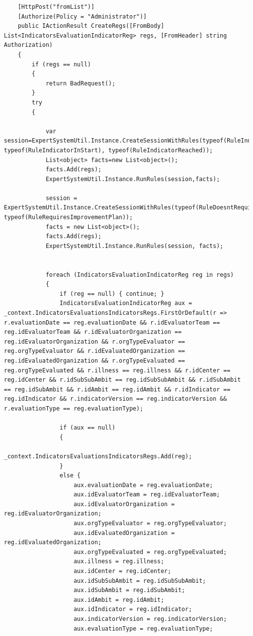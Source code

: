 \begin{lstlisting}
    [HttpPost("fromList")]
    [Authorize(Policy = "Administrator")]
    public IActionResult CreateRegs([FromBody] List<IndicatorsEvaluationIndicatorReg> regs, [FromHeader] string Authorization)
    {
        if (regs == null)
        {
            return BadRequest();
        }
        try
        {

            var session=ExpertSystemUtil.Instance.CreateSessionWithRules(typeof(RuleIndicatorInProcess), typeof(RuleIndicatorInStart), typeof(RuleIndicatorReached));
            List<object> facts=new List<object>();
            facts.Add(regs);
            ExpertSystemUtil.Instance.RunRules(session,facts);

            session = ExpertSystemUtil.Instance.CreateSessionWithRules(typeof(RuleDoesntRequireImprovementPlan), typeof(RuleRequiresImprovementPlan));
            facts = new List<object>();
            facts.Add(regs);
            ExpertSystemUtil.Instance.RunRules(session, facts);


            foreach (IndicatorsEvaluationIndicatorReg reg in regs)
            {
                if (reg == null) { continue; }
                IndicatorsEvaluationIndicatorReg aux = _context.IndicatorsEvaluationsIndicatorsRegs.FirstOrDefault(r => r.evaluationDate == reg.evaluationDate && r.idEvaluatorTeam == reg.idEvaluatorTeam && r.idEvaluatorOrganization == reg.idEvaluatorOrganization && r.orgTypeEvaluator == reg.orgTypeEvaluator && r.idEvaluatedOrganization == reg.idEvaluatedOrganization && r.orgTypeEvaluated == reg.orgTypeEvaluated && r.illness == reg.illness && r.idCenter == reg.idCenter && r.idSubSubAmbit == reg.idSubSubAmbit && r.idSubAmbit == reg.idSubAmbit && r.idAmbit == reg.idAmbit && r.idIndicator == reg.idIndicator && r.indicatorVersion == reg.indicatorVersion && r.evaluationType == reg.evaluationType);

                if (aux == null)
                {
                    _context.IndicatorsEvaluationsIndicatorsRegs.Add(reg);
                }
                else {
                    aux.evaluationDate = reg.evaluationDate;
                    aux.idEvaluatorTeam = reg.idEvaluatorTeam;
                    aux.idEvaluatorOrganization = reg.idEvaluatorOrganization;
                    aux.orgTypeEvaluator = reg.orgTypeEvaluator;
                    aux.idEvaluatedOrganization = reg.idEvaluatedOrganization;
                    aux.orgTypeEvaluated = reg.orgTypeEvaluated;
                    aux.illness = reg.illness;
                    aux.idCenter = reg.idCenter;
                    aux.idSubSubAmbit = reg.idSubSubAmbit;
                    aux.idSubAmbit = reg.idSubAmbit;
                    aux.idAmbit = reg.idAmbit;
                    aux.idIndicator = reg.idIndicator;
                    aux.indicatorVersion = reg.indicatorVersion;
                    aux.evaluationType = reg.evaluationType;


\end{lstlisting}
